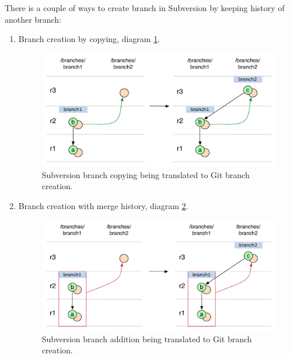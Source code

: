 There is a couple of ways to create branch in Subversion by keeping history of another branch:

\begin{enumerate}
\compactlist
\renewcommand{\figurename}{Diagram}
\item Branch creation by copying, diagram \ref{branch_creation_svn_to_git}.
\begin{figure}[!h]
\centering
\includegraphics[width=\linewidth]{img/diagrams/branch_creation_svn_to_git.pdf}
\caption{Subversion branch copying being translated to Git branch creation.}
\label{branch_creation_svn_to_git}
\end{figure}

\item Branch creation with merge history, diagram \ref{branch_creation_from_mergeinfo_svn_to_git}.
\begin{figure}[!h]
\centering
\renewcommand{\figurename}{Diagram}
\includegraphics[width=\linewidth]{img/diagrams/branch_creation_from_mergeinfo_svn_to_git.pdf}
\caption{Subversion branch addition being translated to Git branch creation.}
\label{branch_creation_from_mergeinfo_svn_to_git}
\end{figure}
\end{enumerate}

